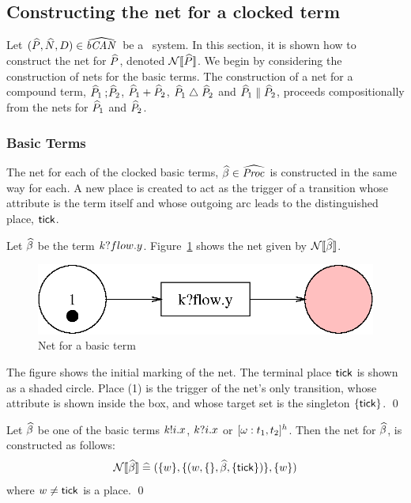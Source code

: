 \subsection{Constructing the net for a clocked term} \label{sec:consnet}
Let $({\widehat{P}},{\widehat{N}},{D}) \in {\widehat{{\text{\it bCAN\/}_{}}}}$ be a \bcandle\
system. In this section, it is shown how to construct the net for
${\widehat{P}}$, denoted ${\mathcal{N}[\![{\widehat{P}}]\!]}$.  We begin by considering the
construction of nets for the basic terms.  The construction of a net
for a compound term, ${\widehat{P}}_1 \mathbin{\mathrm{;}\!} {\widehat{P}}_2$, ${\widehat{P}}_1 \mathbin{\mathrm{+}} {\widehat{P}}_2$, ${\widehat{P}}_1
\mathrel{\mathord{\triangle}} {\widehat{P}}_2$ and $\PP_1 \parallel \PP_2$, proceeds compositionally 
from the nets for ${\widehat{P}}_1$ and ${\widehat{P}}_2$.


\subsubsection{Basic Terms}
The net for each of the clocked basic terms, ${\widehat{\beta}} \in \widehat{\text{\it Proc\/}_{}}$ is
constructed in the same way for each. A new place is
created to act as the trigger of a transition whose attribute is the
term itself and whose outgoing arc leads to the distinguished place,
${\sf tick}$.

\begin{exampleb}
Let ${\widehat{\beta}}$ be the term
${k}?flow.y$. Figure~\ref{fig:basicnet} shows the net given by
${\mathcal{N}[\![{\widehat{\beta}}]\!]}$. 
\begin{figure}[h]
\begin{center}
\includegraphics[width=.4\linewidth]{TGGEN/basic.eps}
\end{center}
\caption{Net for a basic term\label{fig:basicnet}}
\end{figure}
The figure shows the initial marking of the
net. The terminal place ${\sf tick}$ is shown as a shaded circle. Place
(1) is the trigger of the net's only transition, whose attribute is
shown inside the box, and whose target set is the singleton
$\{{\sf tick}\}$.
\qed
\end{exampleb}

\begin{definition}
Let ${\widehat{\beta}}$ be one of the basic terms ${k}!{i}.x$,
${k}?{i}.x$ or $[\omega:t_1,t_2]^h$. Then the net for ${\widehat{\beta}}$, is
constructed as follows:
\[{\mathcal{N}[\![{\widehat{\beta}}]\!]} \mathrel{\widehat=} (\{{w}\},\{({w},\{\},{\widehat{\beta}},\{{\sf tick}\})\},\{{w}\}) \]
where ${w} \neq {\sf tick}$ is a place.
\qed
\end{definition}

